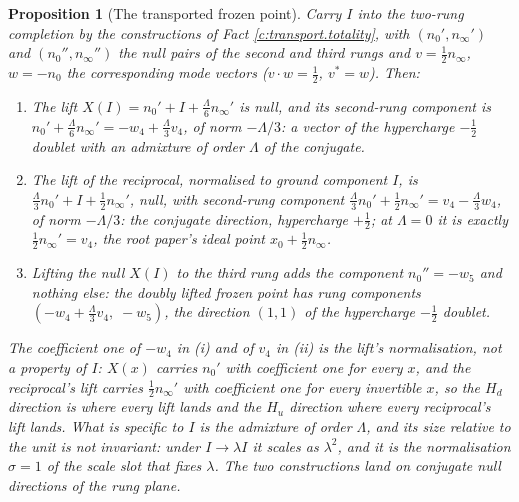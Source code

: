 \documentclass[11pt]{article}
\newtheorem{proposition}[theorem]{Proposition}
\theoremstyle{definition}
\theoremstyle{plain}
\providecommand{\nInf}{}\renewcommand{\nInf}{n_\infty}
\providecommand{\nO}{}\renewcommand{\nO}{n_0}
\begin{document}
\begin{proposition}[The transported frozen point]\label{c:standard-model.transported-frozen-point}
Carry $I$ into the two-rung completion by the constructions of Fact \ref{c:transport.totality}, with $(\nO', \nInf')$ and $(\nO'', \nInf'')$ the null pairs of the second and third rungs and $v = \tfrac12\nInf$, $w = -\nO$ the corresponding mode vectors ($v \cdot w = \tfrac12$, $v^{*} = w$). Then:
\begin{enumerate}
\item[(i)] The lift $X(I) = \nO' + I + \tfrac{\Lambda}{6}\nInf'$ is null, and its second-rung component is $\nO' + \tfrac{\Lambda}{6}\nInf' = -w_{4} + \tfrac{\Lambda}{3}v_{4}$, of norm $-\Lambda/3$: a vector of the hypercharge $-\tfrac12$ doublet with an admixture of order $\Lambda$ of the conjugate.
\item[(ii)] The lift of the reciprocal, normalised to ground component $I$, is $\tfrac{\Lambda}{3}\nO' + I + \tfrac12\nInf'$, null, with second-rung component $\tfrac{\Lambda}{3}\nO' + \tfrac12\nInf' = v_{4} - \tfrac{\Lambda}{3}w_{4}$, of norm $-\Lambda/3$: the conjugate direction, hypercharge $+\tfrac12$; at $\Lambda = 0$ it is exactly $\tfrac12\nInf' = v_{4}$, the root paper's ideal point $x_{0} + \tfrac12\nInf$.
\item[(iii)] Lifting the null $X(I)$ to the third rung adds the component $\nO'' = -w_{5}$ and nothing else: the doubly lifted frozen point has rung components $(-w_{4} + \tfrac{\Lambda}{3}v_{4},\; -w_{5})$, the direction $(1,1)$ of the hypercharge $-\tfrac12$ doublet.
\end{enumerate}
The coefficient one of $-w_{4}$ in (i) and of $v_{4}$ in (ii) is the lift's normalisation, not a property of $I$: $X(x)$ carries $\nO'$ with coefficient one for every $x$, and the reciprocal's lift carries $\tfrac12\nInf'$ with coefficient one for every invertible $x$, so the $H_{d}$ direction is where every lift lands and the $H_{u}$ direction where every reciprocal's lift lands. What is specific to $I$ is the admixture of order $\Lambda$, and its size relative to the unit is not invariant: under $I \to \lambda I$ it scales as $\lambda^{2}$, and it is the normalisation $\sigma = 1$ of the scale slot that fixes $\lambda$. The two constructions land on conjugate null directions of the rung plane.
\end{proposition}
\end{document}
